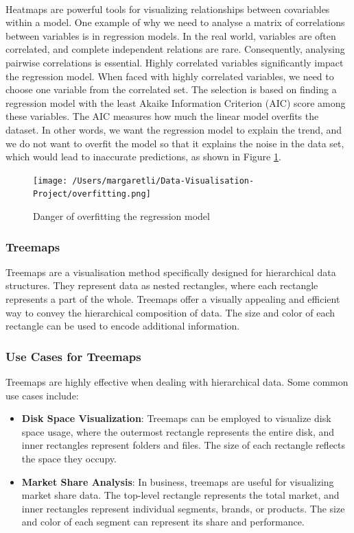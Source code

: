 \documentclass{article}\usepackage[]{graphicx}\usepackage[]{xcolor}
\begin{document}
\\Heatmaps are powerful tools for visualizing relationships between covariables within a model. One example of why we need to analyse a matrix of correlations between variables is in regression models. In the real world, variables are often correlated, and complete independent relations are rare. Consequently, analysing pairwise correlations is essential. Highly correlated variables significantly impact the regression model. When faced with highly correlated variables, we need to choose one variable from the correlated set. The selection is based on finding a regression model with the least Akaike Information Criterion (AIC) score among these variables. The AIC measures how much the linear model overfits the dataset. In other words, we want the regression model to explain the trend, and we do not want to overfit the model so that it explains the noise in the data set, which would lead to inaccurate predictions, as shown in Figure \ref{fig:noisy}.


\begin{figure}[h]
    \centering
    \texttt{[image: /Users/margaretli/Data-Visualisation-Project/overfitting.png]}
    \caption{Danger of overfitting the regression model}
    \label{fig:noisy}
\end{figure}

\subsubsection{Treemaps}
Treemaps are a visualisation method specifically designed for hierarchical data structures. They represent data as nested rectangles, where each rectangle represents a part of the whole. Treemaps offer a visually appealing and efficient way to convey the hierarchical composition of data. The size and color of each rectangle can be used to encode additional information.

\subsubsection{Use Cases for Treemaps}
Treemaps are highly effective when dealing with hierarchical data. Some common use cases include:
\begin{itemize}
\item \textbf{Disk Space Visualization}: Treemaps can be employed to visualize disk space usage, where the outermost rectangle represents the entire disk, and inner rectangles represent folders and files. The size of each rectangle reflects the space they occupy.
\item \textbf{Market Share Analysis}: In business, treemaps are useful for visualizing market share data. The top-level rectangle represents the total market, and inner rectangles represent individual segments, brands, or products. The size and color of each segment can represent its share and performance.
\end{itemize}
\end{document}
